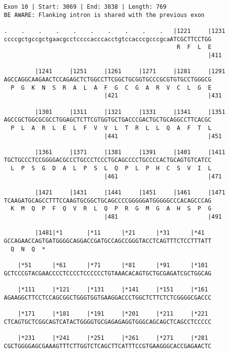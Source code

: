 \documentclass{article}
\begin{document}
\begin{Verbatim}[fontfamily=courier]
Exon 10 | Start: 3069 | End: 3838 | Length: 769
BE AWARE: Flanking intron is shared with the previous exon

.    .    .    .    .    .    .    .    .    .   |1221     |1231
ccccgctgccgctgaacgcctccccacccacctgtccacccgcccgcaATCGCTTCCTGG
                                                  R  F  L  E
                                                           |411

         |1241     |1251     |1261     |1271     |1281     |1291
AGCCAGGCAAGAACTCCAGAGCTCTGGCCTTCGGCTGCGGTGCCCGCGTGTGCCTGGGCG
  P  G  K  N  S  R  A  L  A  F  G  C  G  A  R  V  C  L  G  E
                             |421                          |431

         |1301     |1311     |1321     |1331     |1341     |1351
AGCCGCTGGCGCGCCTGGAGCTCTTCGTGGTGCTGACCCGACTGCTGCAGGCCTTCACGC
  P  L  A  R  L  E  L  F  V  V  L  T  R  L  L  Q  A  F  T  L
                             |441                          |451

         |1361     |1371     |1381     |1391     |1401     |1411
TGCTGCCCTCCGGGGACGCCCTGCCCTCCCTGCAGCCCCTGCCCCACTGCAGTGTCATCC
  L  P  S  G  D  A  L  P  S  L  Q  P  L  P  H  C  S  V  I  L
                             |461                          |471

         |1421     |1431     |1441     |1451     |1461     |1471
TCAAGATGCAGCCTTTCCAAGTGCGGCTGCAGCCCCGGGGGATGGGGGCCCACAGCCCAG
  K  M  Q  P  F  Q  V  R  L  Q  P  R  G  M  G  A  H  S  P  G
                             |481                          |491

         |1481|*1       |*11      |*21      |*31      |*41  
GCCAGAACCAGTGATGGGGCAGGACCGATGCCAGCCGGGTACCTCAGTTTCTCCTTTATT
  Q  N  Q  *   

    |*51      |*61      |*71      |*81      |*91      |*101 
GCTCCCGTACGAACCCCTCCCCTCCCCCCTGTAAACACAGTGCTGCGAGATCGCTGGCAG

    |*111     |*121     |*131     |*141     |*151     |*161 
AGAAGGCTTCCTCCAGCGGCTGGGTGGTGAAGGACCCTGGCTCTTCTCTCGGGGCGACCC

    |*171     |*181     |*191     |*201     |*211     |*221 
CTCAGTGCTCGGCAGTCATACTGGGGTGCGAGAGAGGTGGGCAGCAGCTCAGCCTCCCCC

    |*231     |*241     |*251     |*261     |*271     |*281 
CGCTGGGGAGCGAAAGTTTCTTGGTCTCAGCTTCATTTCCGTGAAGGGCACCGAGAACTC

\end{Verbatim}
\newpage
\end{document}
